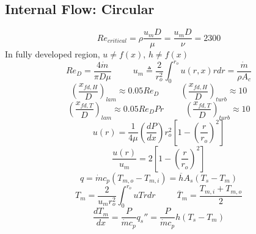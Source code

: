 \documentclass[twocolumn, 12pt]{article}
\begin{document}
\subsection*{Internal Flow: Circular}
\begin{equation*}
    \boxed{ Re_{critical} = \rho \frac{u_m D}{\mu} = \frac{u_m D}{\nu} = 2300  }
\end{equation*}
\noindent
In fully developed region, \(u\neq f(x)\),  \(h \neq f(x)\) 
\begin{equation*}
    Re_D = \frac{4\Dot{m} }{\pi D\mu} \hspace{30pt} u_m \triangleq\frac{2}{r_o^2} \int_0^{r_o} u(r,x)rdr = \frac{\Dot{m}}{ \rho A_c}
\end{equation*}
\begin{equation*}
    \left(\frac{x_{fd,H}}{D} \right)_{lam} \approx 0.05Re_D \hspace{30pt} \left(\frac{x_{fd,H}}{D} \right)_{turb} \approx 10
\end{equation*}
\begin{equation*}
    \left(\frac{x_{fd,T}}{D} \right)_{lam} \approx 0.05Re_DPr \hspace{30pt} \left(\frac{x_{fd,T}}{D} \right)_{turb} \approx 10
\end{equation*}
\begin{equation*}
    u(r) = \frac{1}{4\mu} \left(\frac{dP}{dx} \right)r_o^2 \left[1-\left(\frac{r}{r_o} \right)^2 \right]
\end{equation*}
\begin{equation*}
    \frac{u(r)}{u_m} = 2\left[1-\left(\frac{r}{r_o} \right)^2 \right]
\end{equation*}
\begin{equation*}
    q =\Dot{m}c_p(T_{m,o} - T_{m,i}) = \overline{h} A_s (T_s-T_m)
\end{equation*}
\begin{equation*}
    T_m = \frac{2}{u_mr_o^2} \int^{r_o}_0 uTrdr \hspace{30pt} \overline{T}_m =\frac{T_{m,i} +T_{m,o}}{2}
\end{equation*}
\begin{equation*}
    \frac{dT_m}{dx} = \frac{P}{\Dot{m}c_p} q_s'' = \frac{P}{\Dot{m}c_p} h (T_s-T_m)
\end{equation*}
\end{document}
